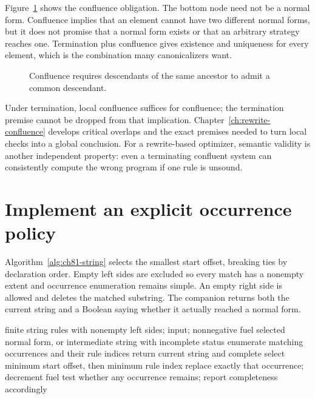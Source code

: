 Figure~\ref{fig:ch81-join} shows the confluence obligation.
The bottom node need not be a normal form.
Confluence implies that an element cannot have two different normal forms, but it does not promise that a normal form exists or that an arbitrary strategy reaches one.
Termination plus confluence gives existence and uniqueness for every element, which is the combination many canonicalizers want.

\begin{figure}[htbp]
\centering
{}
\caption{Confluence requires descendants of the same ancestor to admit a common descendant.}
\label{fig:ch81-join}
\end{figure}

Under termination, local confluence suffices for confluence; the termination premise cannot be dropped from that implication.
Chapter~\ref{ch:rewrite-confluence} develops critical overlaps and the exact premises needed to turn local checks into a global conclusion.
For a rewrite-based optimizer, semantic validity is another independent property: even a terminating confluent system can consistently compute the wrong program if one rule is unsound.

\section{Implement an explicit occurrence policy}
\label{sec:ch81-algorithm}
Algorithm~\ref{alg:ch81-string} selects the smallest start offset, breaking ties by declaration order.
Empty left sides are excluded so every match has a nonempty extent and occurrence enumeration remains simple.
An empty right side is allowed and deletes the matched substring.
The companion returns both the current string and a Boolean saying whether it actually reached a normal form.

\begin{algorithm}[htbp]
\caption{Normalize strings with a documented leftmost rule-order strategy.}
\label{alg:ch81-string}
\begin{pseudocode}
\Require finite string rules with nonempty left sides; input; nonnegative fuel
\Ensure selected normal form, or intermediate string with incomplete status
\State enumerate matching occurrences and their rule indices
 \State return current string and complete \EndIf
\State select minimum start offset, then minimum rule index
\State replace exactly that occurrence; decrement fuel
\EndWhile
\State test whether any occurrence remains; report completeness accordingly
\end{pseudocode}
\end{algorithm}

